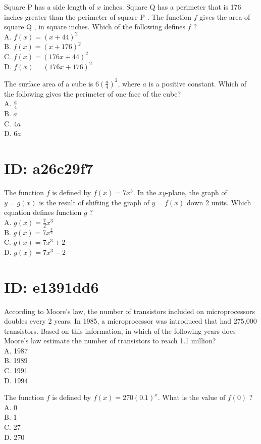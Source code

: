 Square P has a side length of $x$ inches. Square Q has a perimeter that is 176 inches greater than the perimeter of square P . The function $f$ gives the area of square Q , in square inches. Which of the following defines $f$ ?\\
A. $f(x)=(x+44)^{2}$\\
B. $f(x)=(x+176)^{2}$\\
C. $f(x)=(176 x+44)^{2}$\\
D. $f(x)=(176 x+176)^{2}$

The surface area of a cube is $6\left(\frac{a}{4}\right)^{2}$, where $a$ is a positive constant. Which of the following gives the perimeter of one face of the cube?\\
A. $\frac{a}{4}$\\
B. $a$\\
C. $4 a$\\
D. $6 a$

\section*{ID: a26c29f7}
The function $f$ is defined by $f(x)=7 x^{3}$. In the $x y$-plane, the graph of $y=g(x)$ is the result of shifting the graph of $y=f(x)$ down 2 units. Which equation defines function $g$ ?\\
A. $g(x)=\frac{7}{2} x^{3}$\\
B. $g(x)=7 x^{\frac{3}{2}}$\\
C. $g(x)=7 x^{3}+2$\\
D. $g(x)=7 x^{3}-2$

\section*{ID: e1391dd6}
According to Moore's law, the number of transistors included on microprocessors doubles every 2 years. In 1985, a microprocessor was introduced that had 275,000 transistors. Based on this information, in which of the following years does Moore's law estimate the number of transistors to reach 1.1 million?\\
A. 1987\\
B. 1989\\
C. 1991\\
D. 1994

The function $f$ is defined by $f(x)=270(0.1)^{x}$. What is the value of $f(0)$ ?\\
A. 0\\
B. 1\\
C. 27\\
D. 270

